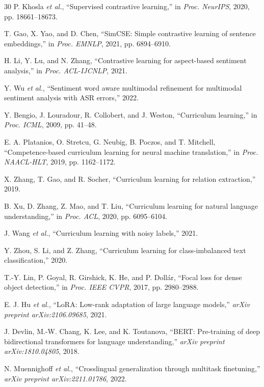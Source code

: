 \documentclass[conference]{IEEEtran}
\begin{document}
\begin{thebibliography}{30}
P. Khosla \textit{et al.},
``Supervised contrastive learning,''
in \textit{Proc. NeurIPS}, 2020, pp. 18661--18673.

T. Gao, X. Yao, and D. Chen,
``SimCSE: Simple contrastive learning of sentence embeddings,''
in \textit{Proc. EMNLP}, 2021, pp. 6894--6910.

H. Li, Y. Lu, and N. Zhang,
``Contrastive learning for aspect-based sentiment analysis,''
in \textit{Proc. ACL-IJCNLP}, 2021.

Y. Wu \textit{et al.},
``Sentiment word aware multimodal refinement for multimodal sentiment analysis with ASR errors,''
2022.

Y. Bengio, J. Louradour, R. Collobert, and J. Weston,
``Curriculum learning,''
in \textit{Proc. ICML}, 2009, pp. 41--48.

E. A. Platanios, O. Stretcu, G. Neubig, B. Poczos, and T. Mitchell,
``Competence-based curriculum learning for neural machine translation,''
in \textit{Proc. NAACL-HLT}, 2019, pp. 1162--1172.

X. Zhang, T. Gao, and R. Socher,
``Curriculum learning for relation extraction,''
2019.

B. Xu, D. Zhang, Z. Mao, and T. Liu,
``Curriculum learning for natural language understanding,''
in \textit{Proc. ACL}, 2020, pp. 6095--6104.

J. Wang \textit{et al.},
``Curriculum learning with noisy labels,''
2021.

Y. Zhou, S. Li, and Z. Zhang,
``Curriculum learning for class-imbalanced text classification,''
2020.

T.-Y. Lin, P. Goyal, R. Girshick, K. He, and P. Doll{\'a}r,
``Focal loss for dense object detection,''
in \textit{Proc. IEEE CVPR}, 2017, pp. 2980--2988.

E. J. Hu \textit{et al.},
``LoRA: Low-rank adaptation of large language models,''
\textit{arXiv preprint arXiv:2106.09685}, 2021.

J. Devlin, M.-W. Chang, K. Lee, and K. Toutanova,
``BERT: Pre-training of deep bidirectional transformers for language understanding,''
\textit{arXiv preprint arXiv:1810.04805}, 2018.

N. Muennighoff \textit{et al.},
``Crosslingual generalization through multitask finetuning,''
\textit{arXiv preprint arXiv:2211.01786}, 2022.


\end{thebibliography}
\end{document}
